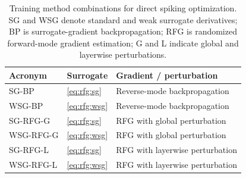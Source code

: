 \begin{table}[t]
  \centering
  \caption{Training method combinations for direct spiking optimization.
  SG and WSG denote standard and weak surrogate derivatives; BP is surrogate-gradient backpropagation; RFG is randomized forward-mode gradient estimation; G and L indicate global and layerwise perturbations.}
  \label{tab:rfg:methods}
  \small
  \begin{tabular}{@{}lll@{}}
    \toprule
    Acronym & Surrogate & Gradient / perturbation \\
    \midrule
    SG-BP   & \eqref{eq:rfg:sg}  & Reverse-mode backpropagation \\
    WSG-BP  & \eqref{eq:rfg:wsg} & Reverse-mode backpropagation \\
    SG-RFG-G  & \eqref{eq:rfg:sg}  & RFG with global perturbation \\
    WSG-RFG-G & \eqref{eq:rfg:wsg} & RFG with global perturbation \\
    SG-RFG-L  & \eqref{eq:rfg:sg}  & RFG with layerwise perturbation \\
    WSG-RFG-L & \eqref{eq:rfg:wsg} & RFG with layerwise perturbation \\
    \bottomrule
  \end{tabular}
\end{table}
